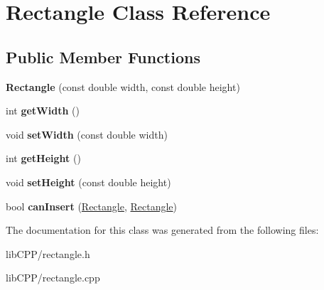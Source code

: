 \hypertarget{classRectangle}{\section{Rectangle Class Reference}
\label{classRectangle}
}
\subsection*{Public Member Functions}
\begin{DoxyCompactItemize}
\item 
\hypertarget{classRectangle_a8c1bc640c993e1284e191b0c2c0e9acb}{{\bfseries Rectangle} (const double width, const double height)}\label{classRectangle_a8c1bc640c993e1284e191b0c2c0e9acb}

\item 
\hypertarget{classRectangle_ab750e4f0666df9c303ad649342bf3efd}{int {\bfseries get\-Width} ()}\label{classRectangle_ab750e4f0666df9c303ad649342bf3efd}

\item 
\hypertarget{classRectangle_a85fd455c8fda2674f857e04a116b8e62}{void {\bfseries set\-Width} (const double width)}\label{classRectangle_a85fd455c8fda2674f857e04a116b8e62}

\item 
\hypertarget{classRectangle_a9b6909485e6cc6e33717c6fba0d29761}{int {\bfseries get\-Height} ()}\label{classRectangle_a9b6909485e6cc6e33717c6fba0d29761}

\item 
\hypertarget{classRectangle_a8dc3f8324fbc25be80fe8888db717574}{void {\bfseries set\-Height} (const double height)}\label{classRectangle_a8dc3f8324fbc25be80fe8888db717574}

\item 
\hypertarget{classRectangle_a3c08182270dfee26126bafc80da5ca3d}{bool {\bfseries can\-Insert} (\hyperlink{classRectangle}{Rectangle}, \hyperlink{classRectangle}{Rectangle})}\label{classRectangle_a3c08182270dfee26126bafc80da5ca3d}

\end{DoxyCompactItemize}


The documentation for this class was generated from the following files\-:\begin{DoxyCompactItemize}
\item 
lib\-C\-P\-P/rectangle.\-h\item 
lib\-C\-P\-P/rectangle.\-cpp\end{DoxyCompactItemize}
